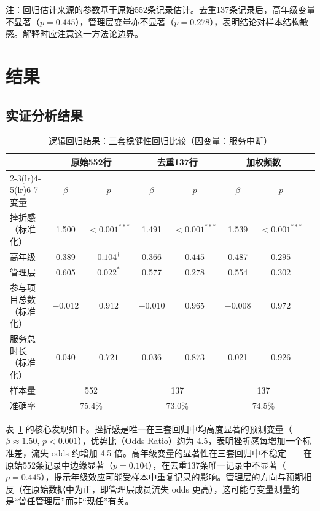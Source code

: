 \documentclass[12pt,a4paper]{article}
\begin{document}
注：回归估计来源的参数基于原始552条记录估计。去重137条记录后，高年级变量不显著（$p=0.445$），管理层变量亦不显著（$p=0.278$），表明结论对样本结构敏感。解释时应注意这一方法论边界。

\section{结果}

\subsection{实证分析结果}

\begin{table}[H]
\centering
\caption{逻辑回归结果：三套稳健性回归比较（因变量：服务中断）}
\label{tab:reg_table}
\begin{tabular}{lccccccc}
\toprule
 & \multicolumn{2}{c}{原始552行} & \multicolumn{2}{c}{去重137行} & \multicolumn{2}{c}{加权频数} \\
\cmidrule(lr){2-3}\cmidrule(lr){4-5}\cmidrule(lr){6-7}
变量 & $\beta$ & $p$ & $\beta$ & $p$ & $\beta$ & $p$ \\
\midrule
挫折感（标准化） & 1.500 & $<0.001^{***}$ & 1.491 & $<0.001^{***}$ & 1.539 & $<0.001^{***}$ \\
高年级 & 0.389 & $0.104^{\dagger}$ & 0.366 & $0.445$ & 0.487 & $0.295$ \\
管理层 & 0.605 & $0.022^{*}$ & 0.577 & $0.278$ & 0.554 & $0.302$ \\
参与项目总数（标准化） & $-0.012$ & $0.912$ & $-0.010$ & $0.965$ & $-0.008$ & $0.972$ \\
服务总时长（标准化） & 0.040 & $0.721$ & 0.036 & $0.873$ & 0.021 & $0.926$ \\
\midrule
样本量 & \multicolumn{2}{c}{552} & \multicolumn{2}{c}{137} & \multicolumn{2}{c}{137} \\
准确率 & \multicolumn{2}{c}{75.4\%} & \multicolumn{2}{c}{73.0\%} & \multicolumn{2}{c}{74.5\%} \\
\bottomrule
\end{tabular}
\end{table}

表~\ref{tab:reg_table} 的核心发现如下。挫折感是唯一在三套回归中均高度显著的预测变量（$\beta \approx 1.50$, $p < 0.001$），优势比（Odds Ratio）约为 4.5，表明挫折感每增加一个标准差，流失 odds 约增加 4.5 倍。高年级变量的显著性在三套回归中不稳定——在原始552条记录中边缘显著（$p = 0.104$），在去重137条唯一记录中不显著（$p = 0.445$），提示年级效应可能受样本中重复记录的影响。管理层的方向与预期相反（在原始数据中为正，即管理层成员流失 odds 更高），这可能与变量测量的是“曾任管理层”而非“现任”有关。
\end{document}
